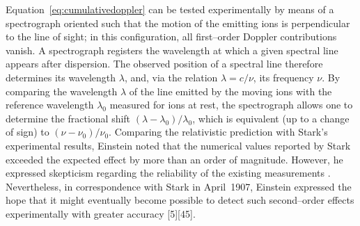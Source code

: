 \documentclass[pdflatex,sn-basic]{sn-jnl}
\begin{document}
Equation~\eqref{eq:cumulativedoppler} can be tested experimentally by means of a spectrograph oriented such that the motion of the emitting ions is perpendicular to the line of sight; in this configuration, all first--order Doppler contributions vanish. A spectrograph registers the wavelength at which a given spectral line appears after dispersion. The observed position of a spectral line therefore determines its wavelength $\lambda$, and, via the relation $\lambda = c/\nu$, its frequency $\nu$. By comparing the wavelength $\lambda$ of the line emitted by the moving ions with the reference wavelength $\lambda_0$ measured for ions at rest, the spectrograph allows one to determine the fractional shift $(\lambda-\lambda_0)/\lambda_0$, which is equivalent (up to a change of sign) to $(\nu-\nu_0)/\nu_0$. Comparing the relativistic prediction with Stark’s experimental results, Einstein noted that the numerical values reported by Stark exceeded the expected effect by more than an order of magnitude. However, he  expressed skepticism regarding the reliability of the existing measurements \citep[198]{Einstein1907d}. Nevertheless, in correspondence with Stark in April~1907, Einstein expressed the hope that it might eventually become possible to detect such second--order effects experimentally with greater accuracy [5][45].



\end{document}
